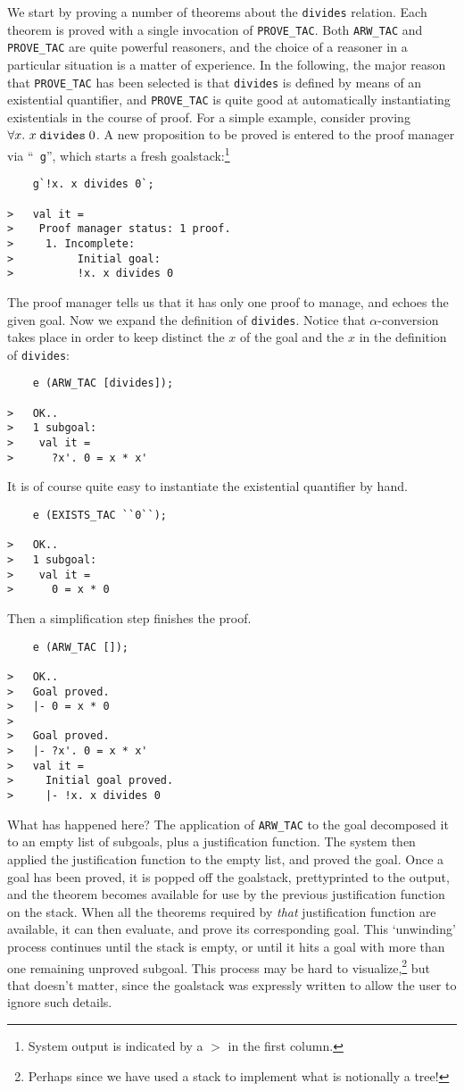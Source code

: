 \documentclass[12pt,fleqn,layout,a4paper]{report}
\begin{document}
We start by proving a number of theorems about the \verb+divides+
relation. Each theorem is proved with a single invocation of
\verb+PROVE_TAC+. Both
\verb+ARW_TAC+ and \verb+PROVE_TAC+ are quite powerful reasoners, and
the choice of a reasoner in a particular situation is a matter of
experience. In the following, the major reason that \verb+PROVE_TAC+ has
been selected is that \verb+divides+ is defined by means of an existential
quantifier, and \verb+PROVE_TAC+ is quite good at automatically
instantiating existentials in the course of proof. For a simple example,
consider proving $\forall x.\ x\; \mbox{\tt divides}\; 0$. A new
proposition to be proved is entered to the proof manager via ``{\tt
g}'', which starts a fresh goalstack:\footnote{System output is indicated
by a {\tt $>$} in the first column.}
{\small\begin{verbatim}
    g`!x. x divides 0`;

>   val it =
>    Proof manager status: 1 proof.
>     1. Incomplete:
>          Initial goal:
>          !x. x divides 0
\end{verbatim}}
The proof manager tells us that it has only one proof to manage, and
echoes the given goal. Now we expand the definition of
\verb+divides+. Notice that $\alpha$-conversion takes place in order to
keep distinct the $x$ of the goal and the $x$ in the definition of
\verb+divides+:
{\small\begin{verbatim}
    e (ARW_TAC [divides]);

>   OK..
>   1 subgoal:
>    val it =
>      ?x'. 0 = x * x'
\end{verbatim}}
It is of course quite easy to instantiate the existential quantifier by
hand.
{\small\begin{verbatim}
    e (EXISTS_TAC ``0``);

>   OK..
>   1 subgoal:
>    val it =
>      0 = x * 0
\end{verbatim}}

Then a simplification step finishes the proof.
{\small\begin{verbatim}
    e (ARW_TAC []);

>   OK..
>   Goal proved.
>   |- 0 = x * 0
>
>   Goal proved.
>   |- ?x'. 0 = x * x'
>   val it =
>     Initial goal proved.
>     |- !x. x divides 0
\end{verbatim}}
What has happened here? The application of \verb+ARW_TAC+ to the goal
decomposed it to an empty list of subgoals, plus a justification
function. The system then applied the justification function to
the empty list, and proved the goal. Once a goal has been proved, it is
popped off the goalstack, prettyprinted to the output, and the theorem
becomes available for use by the previous justification function on the
stack. When all the theorems required by {\it that\/} justification
function are available, it can then evaluate, and prove its
corresponding goal. This `unwinding' process continues until the stack
is empty, or until it hits a goal with more than one remaining unproved
subgoal. This process may be hard to visualize,\footnote{Perhaps since we
have used a stack to implement what is notionally a tree!} but that doesn't
matter, since the goalstack was expressly written to allow the user to
ignore such details.
\end{document}
